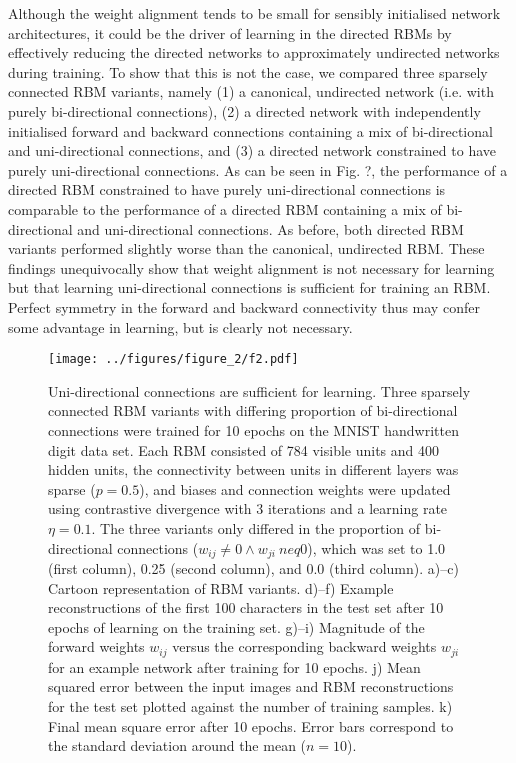 \documentclass[11pt]{article}
\begin{document}
Although the weight alignment tends to be small for sensibly
initialised network architectures, it could be the driver of learning
in the directed RBMs by effectively reducing the directed networks to
approximately undirected networks during training. To show that this
is not the case, we compared three sparsely connected RBM variants,
namely (1) a canonical, undirected network (i.e. with purely
bi-directional connections), (2) a directed network with independently
initialised forward and backward connections containing a mix of
bi-directional and uni-directional connections, and (3) a directed
network constrained to have purely uni-directional connections. As can
be seen in Fig. ?, the performance of a directed RBM constrained to
have purely uni-directional connections is comparable to the
performance of a directed RBM containing a mix of bi-directional and
uni-directional connections. As before, both directed RBM variants
performed slightly worse than the canonical, undirected RBM. These
findings unequivocally show that weight alignment is not necessary for
learning but that learning uni-directional connections is sufficient
for training an RBM. Perfect symmetry in the forward and backward
connectivity thus may confer some advantage in learning, but is
clearly not necessary.

\begin{figure}
  \centering
  \texttt{[image: ../figures/figure\_2/f2.pdf]}
  \caption{\footnotesize
    Uni-directional connections are sufficient for learning.
    Three sparsely connected RBM variants with differing proportion of bi-directional connections were trained for 10 epochs on the MNIST handwritten digit data set.
    Each RBM consisted of 784 visible units and 400 hidden units,
    the connectivity between units in different layers was sparse ($p=0.5$),
    and biases and connection weights were updated using contrastive divergence with 3 iterations and a learning rate $\eta=0.1$.
    The three variants only differed in the proportion of
    bi-directional connections ($w_{ij} \neq 0 \land w_{ji} \ neq 0$),
    which was set to 1.0 (first column), 0.25 (second column), and 0.0 (third column).
    a)--c) Cartoon representation of RBM variants.
    d)--f) Example reconstructions of the first 100 characters in the test set after 10 epochs of learning on the training set.
    g)--i) Magnitude of the forward weights $w_{ij}$ versus the corresponding backward weights $w_{ji}$ for an example network after training for 10 epochs.
    j) Mean squared error between the input images and RBM reconstructions for the test set plotted against the number of training samples.
    k) Final mean square error after 10 epochs. Error bars correspond to the standard deviation around the mean ($n = 10$).
  }
\end{figure}
\end{document}

